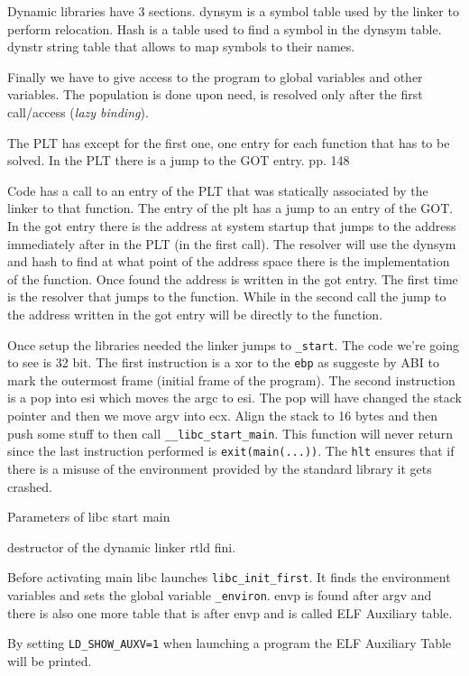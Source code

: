 \documentclass[twoside]{article}
\begin{document}
Dynamic libraries have 3 sections. dynsym is a symbol table used by the linker
to perform relocation. Hash is a table used to find a symbol in the dynsym
table. dynstr string table that allows to map symbols to their names.

Finally we have to give access to the program to global variables and other
variables. The population is done upon need, is resolved only after the first
call/access (\textit{lazy binding}).

The PLT has except for the first one, one entry for each function that has to be
solved. In the PLT there is a jump to the GOT entry. pp. 148

Code has a call to an entry of the PLT that was statically associated by the
linker to that function. The entry of the plt has a jump to an entry of the GOT.
In the got entry there is the address at system startup that jumps to the
address immediately after in the PLT (in the first call). The resolver will
use the dynsym and hash
to find at what point of the address space there is the implementation of the
function. Once found the address is written in the got entry. The first time is
the resolver that jumps to the function. While in the second call the jump to
the address written in the got entry will be directly to the function.


Once setup the libraries needed the linker jumps to \texttt{_start}. The code
we're going to see is 32 bit. The first instruction is a xor to the \texttt{ebp}
as suggeste by ABI to mark the outermost frame (initial frame of the program).
The second instruction is a pop into esi which moves the argc to esi. The pop
will have changed the stack pointer and then we move argv into ecx. Align the
stack to 16 bytes and then push some stuff to then call
\texttt{__libc_start_main}. This function will never return since the last
instruction performed is \texttt{exit(main(...))}. The \texttt{hlt} ensures that
if there is a misuse of the environment provided by the standard library it gets
crashed.

Parameters of libc start main

destructor of the dynamic linker rtld fini.

Before activating main libc launches \texttt{libc_init_first}. It finds the
environment variables and sets the global variable \texttt{_environ}. envp is
found after argv and there is also one more table that is after envp and is
called ELF Auxiliary table.

By setting \texttt{LD_SHOW_AUXV=1} when launching a program the ELF Auxiliary
Table will be printed.
\end{document}
